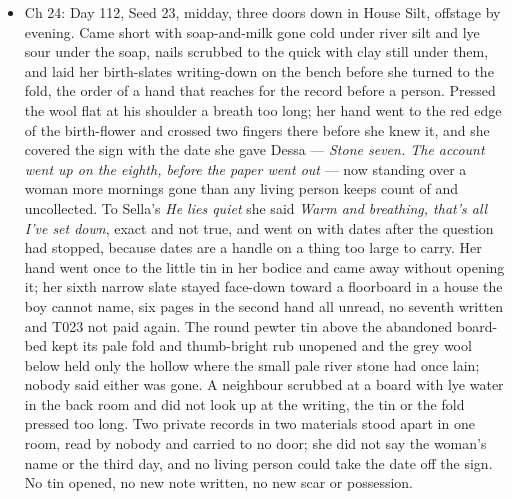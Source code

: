 \documentclass{design/chronicle}
\begin{document}
{\begin{itemize}[leftmargin=1.4em,itemsep=1pt,topsep=3pt,parsep=0pt]
\item Ch 24: Day 112, Seed 23, midday, three doors down in House Silt, offstage by evening. Came short with soap-and-milk gone cold under river silt and lye sour under the soap, nails scrubbed to the quick with clay still under them, and laid her birth-slates writing-down on the bench before she turned to the fold, the order of a hand that reaches for the record before a person. Pressed the wool flat at his shoulder a breath too long; her hand went to the red edge of the birth-flower and crossed two fingers there before she knew it, and she covered the sign with the date she gave Dessa — \emph{Stone seven. The account went up on the eighth, before the paper went out} — now standing over a woman more mornings gone than any living person keeps count of and uncollected. To Sella’s \emph{He lies quiet} she said \emph{Warm and breathing, that’s all I’ve set down}, exact and not true, and went on with dates after the question had stopped, because dates are a handle on a thing too large to carry. Her hand went once to the little tin in her bodice and came away without opening it; her sixth narrow slate stayed face-down toward a floorboard in a house the boy cannot name, six pages in the second hand all unread, no seventh written and T023 not paid again. The round pewter tin above the abandoned board-bed kept its pale fold and thumb-bright rub unopened and the grey wool below held only the hollow where the small pale river stone had once lain; nobody said either was gone. A neighbour scrubbed at a board with lye water in the back room and did not look up at the writing, the tin or the fold pressed too long. Two private records in two materials stood apart in one room, read by nobody and carried to no door; she did not say the woman’s name or the third day, and no living person could take the date off the sign. No tin opened, no new note written, no new scar or possession.

\end{itemize}

\begin{itemize}[leftmargin=1.4em,itemsep=1pt,topsep=3pt,parsep=0pt]


\end{itemize}}
\end{document}
